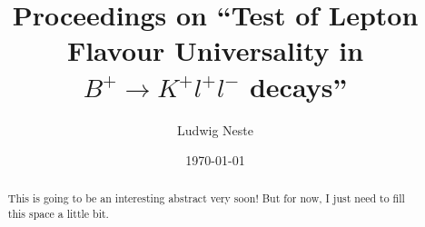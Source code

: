 \documentclass[%
 reprint,
 amsmath,amssymb,
 aps,
]{revtex4-2}
\begin{document}
\title{Proceedings on \enquote{Test of Lepton Flavour Universality in $B^+\to K^+l^+l^- $ decays}}

\author{Ludwig Neste}


\date{\today}%

\begin{abstract}
	This is going to be an interesting abstract very soon! But for now, I just need to fill this space a little bit.
\end{abstract}

\maketitle





\nocite{*}
\end{document}
